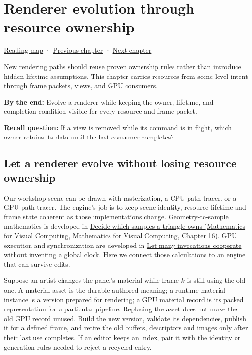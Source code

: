 \hypertarget{06-engine-ii-ch025}{}
\chapter{Renderer evolution through resource ownership}\label{stagechapter:06-engine-ii-ch025}\label{06-engine-ii-ch025-renderer-evolution-through-resource-ownership}

\hyperref[volume-reading-map]{Reading map} · \hyperref[05-engine-i-ch024-profiling-and-languageplatform-ownership]{Previous chapter} · \hyperref[06-engine-ii-ch026-descriptor-arrays-and-backend-limits]{Next chapter}

New rendering paths should reuse proven ownership rules rather than introduce hidden lifetime assumptions. This chapter carries resources from scene-level intent through frame packets, views, and GPU consumers.

\textbf{By the end:} Evolve a renderer while keeping the owner, lifetime, and completion condition visible for every resource and frame packet.

\textbf{Recall question:} If a view is removed while its command is in flight, which owner retains its data until the last consumer completes?

\section{Let a renderer evolve without losing resource ownership}\label{06-engine-ii-ch025-let-a-renderer-evolve-without-losing-resource-ownership}

Our workshop scene can be drawn with rasterization, a CPU path tracer, or a GPU path tracer. The engine's job is to keep scene identity, resource lifetime and frame state coherent as those implementations change. Geometry-to-sample mathematics is developed in \href{../02-Mathematics-for-Visual-Computing/main.pdf\#nameddest=03-visual-computing-i-ch012-decide-which-samples-a-triangle-owns}{Decide which samples a triangle owns (Mathematics for Visual Computing, Mathematics for Visual Computing, Chapter 16)}. GPU execution and synchronization are developed in \hyperref[01-foundations-i-ch008-let-many-invocations-cooperate-without-inventing-a-global-clock]{Let many invocations cooperate without inventing a global clock}. Here we connect those calculations to an engine that can survive edits.

Suppose an artist changes the panel's material while frame \(k\) is still using the old one. A material asset is the durable authored meaning; a runtime material instance is a version prepared for rendering; a GPU material record is its packed representation for a particular pipeline. Replacing the asset does not make the old GPU record unused. Build the new version, validate its dependencies, publish it for a defined frame, and retire the old buffers, descriptors and images only after their last use completes. If an editor keeps an index, pair it with the identity or generation rules needed to reject a recycled entry.

